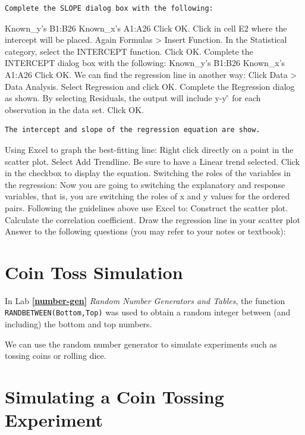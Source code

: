 \documentclass[
]{book}
\begin{document}
\begin{verbatim}
Complete the SLOPE dialog box with the following:
\end{verbatim}

Known\_y's B1:B26
Known\_x's A1:A26
Click OK.
Click in cell E2 where the intercept will be placed.
Again Formulas \textgreater{} Insert Function.
In the Statistical category, select the INTERCEPT function. Click OK.
Complete the INTERCEPT dialog box with the following:
Known\_y's B1:B26
Known\_x's A1:A26
Click OK.
We can find the regression line in another way:
Click Data \textgreater{} Data Analysis. Select Regression and click OK. Complete the Regression dialog as shown. By selecting Residuals, the output will include y-y ̂ for each observation in the data set. Click OK.

\begin{verbatim}
The intercept and slope of the regression equation are show. 
\end{verbatim}

Using Excel to graph the best-fitting line:
Right click directly on a point in the scatter plot.
Select Add Trendline.
Be sure to have a Linear trend selected.
Click in the checkbox to display the equation.
Switching the roles of the variables in the regression:
Now you are going to switching the explanatory and response variables, that is, you are switching the roles of x and y values for the ordered pairs. Following the guidelines above use Excel to:
Construct the scatter plot.
Calculate the correlation coefficient.
Draw the regression line in your scatter plot
Answer to the following questions (you may refer to your notes or textbook):

\hypertarget{coin-toss-simulation}{%
\section{Coin Toss Simulation}\label{coin-toss-simulation}}

In Lab \textbf{\ref{number-gen}} \emph{Random Number Generators and Tables}, the function \texttt{RANDBETWEEN(Bottom,Top)} was used to obtain a random integer between (and including) the bottom and top numbers.

We can use the random number generator to simulate experiments such as tossing coins or rolling dice.

\hypertarget{simulating-a-coin-tossing-experiment}{%
\section{Simulating a Coin Tossing Experiment}\label{simulating-a-coin-tossing-experiment}}
\end{document}
